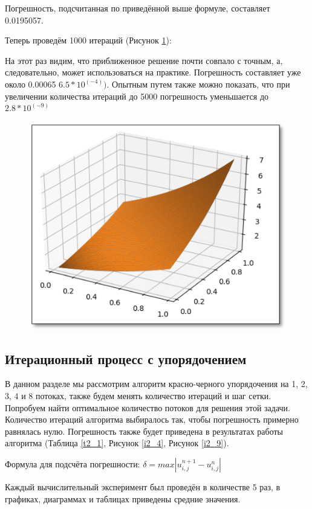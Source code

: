 \documentclass[a4paper, 14pt]{extreport}
\begin{document}
	Погрешность, подсчитанная по приведённой выше формуле, составляет 0.0195057.
	
	Теперь проведём 1000 итераций (Рисунок \ref{i2_3}):

	На этот раз видим, что приближенное решение почти совпало с точным, а, следовательно, может использоваться на практике. Погрешность составляет уже около 0.00065 $6.5*10^{(-4)})$. Опытным путем также можно показать, что при увеличении количества итераций до 5000 погрешность уменьшается до $2.8*10^{(-9)}$
	
	\begin{figure}[h]
		\begin{center}
			\includegraphics[width=0.5\linewidth]{yacobi_1000}
			\label{i2_3}
		\end{center}
	\end{figure}

    \subsection{Итерационный процесс с упорядочением }
    В данном разделе мы рассмотрим алгоритм красно-черного упорядочения на 1, 2, 3, 4 и 8 потоках, также будем менять количество итераций и шаг сетки. Попробуем найти оптимальное количество потоков для решения этой задачи. Количество итераций алгоритма выбиралось так, чтобы погрешность примерно равнялась нулю. Погрешность также будет приведена в результатах работы алгоритма (Таблица \ref{t2_1}, Рисунок \ref{i2_4}, Рисунок \ref{i2_9}).
    
    Формула для подсчёта погрешности:
$\delta = max|u_{i,j}^{n+1} - u_{i,j}^n|$
    
    Каждый вычислительный эксперимент был проведён в количестве 5 раз, в графиках, диаграммах и таблицах приведены средние значения.
\end{document}
